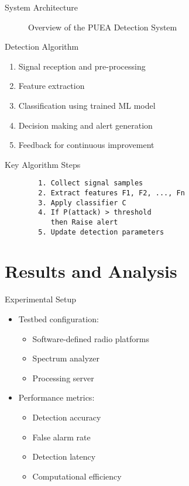 \documentclass{beamer}
\begin{document}
\begin{frame}{System Architecture}
    \centering
    \begin{figure}
        \caption{Overview of the PUEA Detection System}
    \end{figure}
\end{frame}

\begin{frame}{Detection Algorithm}
    \begin{enumerate}
        \item Signal reception and pre-processing
        \item Feature extraction
        \item Classification using trained ML model
        \item Decision making and alert generation
        \item Feedback for continuous improvement
    \end{enumerate}
    
    \begin{block}{Key Algorithm Steps}
        \begin{verbatim}
        1. Collect signal samples
        2. Extract features F1, F2, ..., Fn
        3. Apply classifier C
        4. If P(attack) > threshold
           then Raise alert
        5. Update detection parameters
        \end{verbatim}
    \end{block}
\end{frame}

\section{Results and Analysis}
\begin{frame}{Experimental Setup}
    \begin{itemize}
        \item Testbed configuration:
        \begin{itemize}
            \item Software-defined radio platforms
            \item Spectrum analyzer
            \item Processing server
        \end{itemize}
        \item Performance metrics:
        \begin{itemize}
            \item Detection accuracy
            \item False alarm rate
            \item Detection latency
            \item Computational efficiency
        \end{itemize}
    \end{itemize}
\end{frame}
\end{document}
